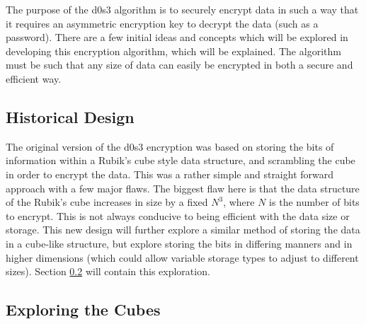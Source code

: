 The purpose of the d0s3 algorithm is to securely encrypt data in such a way that it requires an asymmetric encryption key to decrypt the data (such as a password). There are a few initial ideas and concepts which will be explored in developing this encryption algorithm, which will be explained. The algorithm must be such that any size of data can easily be encrypted in both a secure and efficient way.






\subsection{Historical Design}

The original version of the d0s3 encryption was based on storing the bits of information within a Rubik's cube style data structure, and scrambling the cube in order to encrypt the data. This was a rather simple and straight forward approach with a few major flaws. The biggest flaw here is that the data structure of the Rubik's cube increases in size by a fixed $N^3$, where $N$ is the number of bits to encrypt. This is not always conducive to being efficient with the data size or storage. This new design will further explore a similar method of storing the data in a cube-like structure, but explore storing the bits in differing manners and in higher dimensions (which could allow variable storage types to adjust to different sizes). Section \ref{sec:exploring-cubes} will contain this exploration.










\subsection{Exploring the Cubes}\label{sec:exploring-cubes}

